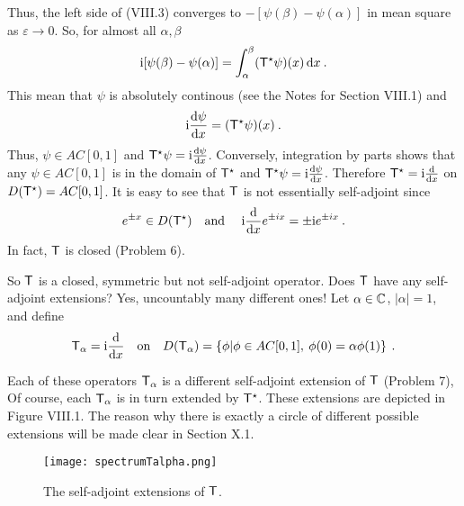 \begin{example}
Thus, the left side of (VIII.3)
converges to $-[\psi(\beta) - \psi(\alpha)]$ in mean square as $\varepsilon \rightarrow 0$. So, for almost all $\alpha, \beta$ \begin{align}
    \mathrm{i}[\psi(\beta) - \psi(\alpha)] = \int_\alpha^\beta (\mathsf{T}^\star \psi)(x) \, \mathrm{d} x \:.
\end{align}
This mean that $\psi$ is absolutely continous (see the Notes for Section VIII.1) and \begin{align}
    \mathrm{i} \frac{\mathrm{d}\psi}{\mathrm{d}x} = (\mathsf{T}^\star \psi)(x) \:.
\end{align}
Thus, $\psi \in AC[0,1]$ and $\mathsf{T}^\star \psi = \mathrm{i} \frac{\mathrm{d}\psi}{\mathrm{d}x} $. Conversely, integration by parts
shows that any $\psi \in AC[0,1]$ is in the domain of $\mathsf{T}^\star$ and $\mathsf{T}^\star \psi = \mathrm{i} \frac{\mathrm{d}\psi}{\mathrm{d}x}$. Therefore $\mathsf{T}^\star = \mathrm{i} \frac{\mathrm{d}}{\mathrm{d}x}$ on $D(\mathsf{T}^\star) = AC[0,1]$.
It is easy to see that $\mathsf{T}$ is not essentially self-adjoint since \begin{align}
    e^{\pm x} \in D(\mathsf{T}^\star) \quad \text{and } \quad \mathrm{i} \frac{\mathrm{d}}{\mathrm{d}x} e^{\pm i x} = \pm \mathrm{i} e^{\pm  i x} \:.
\end{align}
In fact, $\mathsf{T}$ is closed (Problem 6).

So $\mathsf{T}$ is a closed, symmetric but not self-adjoint operator.
Does $\mathsf{T}$ have any self-adjoint extensions? Yes, uncountably many different ones! Let $\alpha \in \mathbb{C}$, $|\alpha| = 1$, and define
\begin{align}
    \mathsf{T}_\alpha = \mathrm{i} \frac{\mathrm{d}}{\mathrm{d}x} \quad \text{on} \quad D(\mathsf{T}_\alpha) = \left \lbrace \phi | \phi \in AC[0,1] , \: \phi(0) = \alpha \phi(1) \right \rbrace \:.
\end{align}

Each of these operators $\mathsf{T}_\alpha$ is a different self-adjoint extension of $\mathsf{T}$ (Problem 7),
Of course, each $\mathsf{T}_\alpha$ is in turn extended by $\mathsf{T}^\star$. These extensions are depicted in Figure VIII.1. The reason why there is exactly a circle of different possible extensions will be made clear in Section X.1.

\begin{figure}[H]
    \centering
    \texttt{[image: spectrumTalpha.png]}
    \caption{The self-adjoint extensions of $\mathsf{T}$.}
\end{figure}

\end{example}
